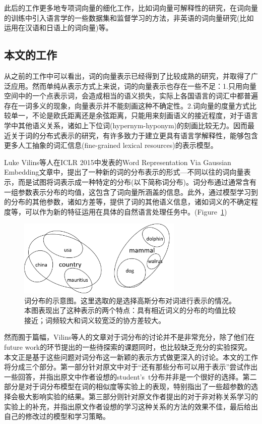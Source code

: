 \documentclass[13pt]{article}
\begin{document}
此后的工作更多地专项词向量的细化工作，比如词向量可解释性的研究，在词向量的训练中引入语言学的一些数据集和监督学习的方法，非英语的词向量研究(比如运用在汉语和日语上的词向量)等。

\subsection{本文的工作}
从之前的工作中可以看出，词的向量表示已经得到了比较成熟的研究，并取得了广泛应用。然而单纯从表示方式上来说，词的向量表示也存在一些不足：1.只用向量空间中的一个点表示词，会造成相当的语义损失，实际上各国语言的词汇中都普遍存在一词多义的现象，向量表示并不能刻画这种不确定性。2.词向量的度量方式比较单一，不论是欧氏距离还是余弦距离，只能用来刻画语义的接近程度，对于语言学中其他语义关系，诸如上下位词(hypernym-hyponym)的刻画比较无力。因而最近关于词的分布式表示的研究，有许多致力于建立更具有语言学解释性，能够包含更多人工抽象的词汇信息(fine-grained lexical resources)的表示模型。

Luke Vilins等人在ICLR 2015中发表的Word Representation Via Gaussian Embedding\cite{vilnis2014word}文章中，提出了一种新的词的分布表示的形式---不同以往的词向量表示，而是试图将词表示成一种特定的分布(以下简称词分布)。词分布通过通常含有一组参数表示分布的均值，这包含了词向量所涵盖的信息。此外，通过模型学习到的分布的其他参数，诸如方差等，提供了词的其他语义信息，诸如词义的不确定程度等，可以作为新的特征运用在具体的自然语言处理任务中。(Figure\ \ref{fig:w2d})

\begin{figure}
	\includegraphics[width=0.7\textwidth]{word2gauss_illustrate.png}
	\caption{词分布的示意图。这里选取的是选择高斯分布对词进行表示的情况。本图表现出了这种表示的两个特点：具有相近词义的分布的均值比较接近；词频较大和词义较宽泛的协方差较大。}
	\centering
	\label{fig:w2d}
\end{figure}

然而囿于篇幅，Vilins等人的文章对于词分布的讨论并不是非常充分，除了他们在future work的环节提出的一些待探索的课题同时，也比较缺乏充分的实验探究。本文正是基于这些问题对词分布这一新颖的表示方式做更深入的讨论。本文的工作将分成三个部分。第一部分针对原文中对于“还有那些分布可以用于表示”尝试作出一些回答，并指出原文中作者设想的student's\ t分布并非是一个很好的选择。第二部分是对于词分布模型在词的相似度等实验上的表现，特别指出了一些超参数的选择会极大影响实验的结果。第三部分则针对原文作者提出的对于非对称关系学习的实验上的补充，并指出原文作者设想的学习这种关系的方法的效果不佳，最后给出自己的修改过的模型和学习策略。
\end{document}
